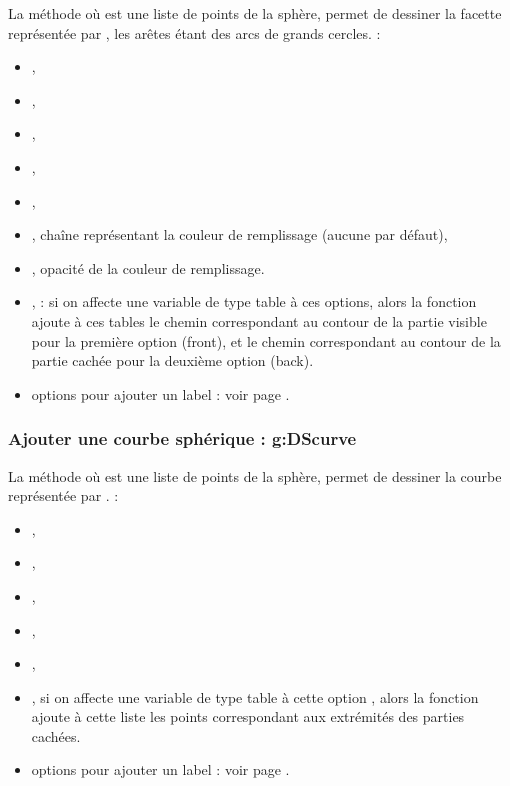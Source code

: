 La méthode  où  est une liste de points de la sphère, permet de dessiner la facette représentée par , les arêtes étant des arcs de grands cercles. \writeoptions :
    \begin{itemize}
        \item {}, 
        \item {},
        \item {},
        \item {},
        \item {},
        \item {}, chaîne représentant la couleur de remplissage (aucune par défaut),
        \item {}, opacité de la couleur de remplissage.
        \item {},  : si on affecte une variable de type table à ces options, alors la fonction ajoute à ces tables le chemin correspondant au contour de la partie visible pour la première option (front), et le  chemin correspondant au contour de la partie cachée pour la deuxième option (back).
        \item options pour ajouter un label : voir page \pageref{addlabel}.
    \end{itemize}
    
\subsubsection{Ajouter une courbe sphérique : g:DScurve}

La méthode  où  est une liste de points de la sphère, permet de dessiner la courbe représentée par . \writeoptions :
    \begin{itemize}
        \item {}, 
        \item {},
        \item {},
        \item {},
        \item {},
        \item {}, si on affecte une variable de type table à cette option , alors la fonction ajoute à cette liste les points correspondant aux extrémités des parties cachées.
        \item options pour ajouter un label : voir page \pageref{addlabel}.
    \end{itemize}
    
